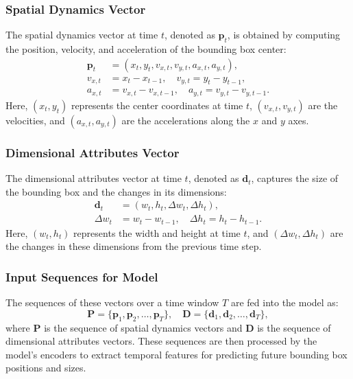 \documentclass[12pt,oneside]{book} %
\begin{document}
\subsubsection{Spatial Dynamics Vector}
The spatial dynamics vector at time $t$, denoted as $\mathbf{p}_t$, is obtained
by computing the position, velocity, and acceleration of the bounding box
center:
\begin{align}
    \mathbf{p}_t & = \left(x_t, y_t, v_{x,t}, v_{y,t}, a_{x,t}, a_{y,t}\right), \\
    v_{x,t}      & = x_t - x_{t-1}, \quad v_{y,t} = y_t - y_{t-1},              \\
    a_{x,t}      & = v_{x,t} - v_{x,t-1}, \quad a_{y,t} = v_{y,t} - v_{y,t-1}.
\end{align}
Here, $(x_t, y_t)$ represents the center coordinates at time $t$, $(v_{x,t}, v_{y,t})$ are the velocities, and $(a_{x,t}, a_{y,t})$ are the accelerations along the $x$ and $y$ axes.

\subsubsection{Dimensional Attributes Vector}
The dimensional attributes vector at time $t$, denoted as $\mathbf{d}_t$,
captures the size of the bounding box and the changes in its dimensions:
\begin{align}
    \mathbf{d}_t & = \left(w_t, h_t, \Delta w_t, \Delta h_t\right),    \\
    \Delta w_t   & = w_t - w_{t-1}, \quad \Delta h_t = h_t - h_{t-1}.
\end{align}
Here, $(w_t, h_t)$ represents the width and height at time $t$, and $(\Delta w_t, \Delta h_t)$ are the changes in these dimensions from the previous time step.

\subsubsection{Input Sequences for Model}
The sequences of these vectors over a time window $T$ are fed into the model
as:
\[
    \mathbf{P} = \{\mathbf{p}_1, \mathbf{p}_2, \dots, \mathbf{p}_T\}, \quad \mathbf{D} = \{\mathbf{d}_1, \mathbf{d}_2, \dots, \mathbf{d}_T\},
\]
where $\mathbf{P}$ is the sequence of spatial dynamics vectors and $\mathbf{D}$
is the sequence of dimensional attributes vectors. These sequences are then
processed by the model's encoders to extract temporal features for predicting
future bounding box positions and sizes.
\end{document}
